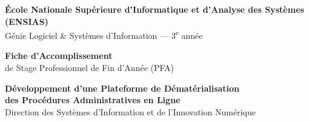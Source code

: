 \documentclass[a4paper,11pt]{article}
\begin{document}
\thispagestyle{empty}


\vspace*{0.5cm}
\begin{center}
  {\color{white}\sffamily\Large\bfseries
    \'{E}cole Nationale Sup\'{e}rieure d'Informatique et d'Analyse des Syst\`{e}mes (ENSIAS)}\\[0.25cm]
  {\color{white!85!InstitBlue}\sffamily\normalsize
    G\'{e}nie Logiciel \& Syst\`{e}mes d'Information --- 3\textsuperscript{e} ann\'{e}e}
\end{center}

\vspace{3.8cm}

\begin{center}
  {\sffamily\Huge\bfseries\color{InstitBlue} Fiche d'Accomplissement}\\[0.35cm]
  {\sffamily\large\color{InstitGrey} de Stage Professionnel de Fin d'Ann\'{e}e (PFA)}\\[1cm]

  \noindent\colorbox{InstitBlue!8}{%
    \parbox{13cm}{\centering\vspace{6pt}
      {\sffamily\large\bfseries\color{InstitBlue}
        D\'{e}veloppement d'une Plateforme de D\'{e}mat\'{e}rialisation\\
        des Proc\'{e}dures Administratives en Ligne}\\[4pt]
      {\sffamily\small\color{InstitGrey}
        Direction des Syst\`{e}mes d'Information et de l'Innovation Num\'{e}rique}
      \vspace{4pt}}}
\end{center}

\vspace{1.5cm}
\end{document}

